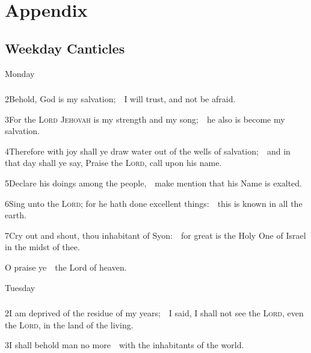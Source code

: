 \chapter{Appendix}
\section{Weekday Canticles}

\centerline{Monday}
\subsection{}


2\enspace Behold, God is my salvation;\ \star\ I will trust, and not be afraid.

3\enspace For the {\scshape Lord Jehovah} is my strength and my song;\ \star\ he also is become my salvation.

4\enspace Therefore with joy shall ye draw water out of the wells of salvation;\ \star\ and in that day shall ye say, Praise the {\scshape Lord}, call upon his name.

5\enspace Declare his doings among the people,\ \star\ make mention that his Name is exalted.

6\enspace Sing unto the {\scshape Lord}; for he hath done excellent things:\ \star\ this is known in all the earth.

7\enspace Cry out and shout, thou inhabitant of Syon:\ \star\ for great is the Holy One of Israel in the midst of thee.

 O praise ye\ \star\ the Lord of heaven.

\medskip

\centerline{Tuesday}
\subsection{}

2\enspace I am deprived of the residue of my years;\ \star\ I said, I shall not see the {\scshape Lord}, even the {\scshape Lord}, in the land of the living.

3\enspace I shall behold man no more\ \star\ with the inhabitants of the world.

